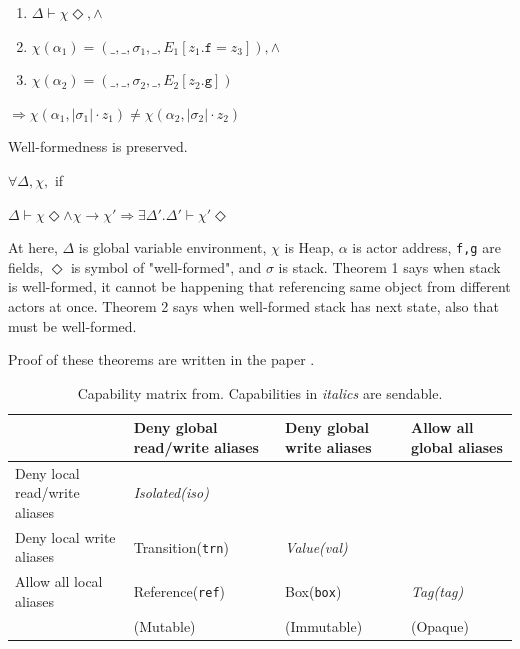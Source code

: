 \documentclass{article}
\begin{document}
\begin{multicols}{2}
\begin{theorem}
	\begin{enumerate}
		\item $\Delta \vdash \chi \Diamond, \land$ 
		\item $\chi(\alpha_1) = (\_,\_,\sigma_1, \_,  E_1[z_1.\texttt{f} = z_3]), \land$ 
		\item $\chi(\alpha_2) = (\_,\_,\sigma_2, \_,  E_2[z_2.\texttt{g}])$
	\end{enumerate} 
	
	 $\Rightarrow \chi(\alpha_1, |\sigma_1|\cdot z_1) \neq \chi(\alpha_2, |\sigma_2| \cdot z_2)$
\end{theorem}

\begin{theorem} 
	Well-formedness is preserved.
	
	$\forall \Delta, \chi,$ if
	
	 $\Delta \vdash \chi \Diamond \land \chi \rightarrow \chi' \Rightarrow  \exists \Delta'.\Delta' \vdash \chi'\Diamond$
\end{theorem}

At here, $\Delta$ is global variable environment, $\chi$ is Heap, $\alpha$ is actor address, \texttt{f,g} are fields, $\Diamond$ is symbol of "well-formed", and $\sigma$ is stack. 
Theorem 1 says when stack is well-formed, it cannot be happening that referencing same object from different actors at once. Theorem 2 says when well-formed stack has next state, also that must be well-formed.

Proof of these theorems are written in the paper \cite{type-proof-paper}.


\begin{table}[]
\begin{tabularx}{\textwidth}{|X|X|X|X|}
 \hline
 & Deny global read/write aliases & Deny global write aliases & Allow all global aliases \\  \hline
Deny local read/write aliases & \textit{Isolated(iso) }    &                           &                        \\  \hline
Deny local write aliases      & Transition(\texttt{trn})                & \textit{Value(val)  }              &                        \\  \hline
Allow all local aliases       & Reference(\texttt{ref})                 & Box(\texttt{box})                  & \textit{Tag(tag)  }             \\  \hline
                              & (Mutable)                      & (Immutable)               & (Opaque)   \\ \hline           
\end{tabularx}
\caption{Capability matrix from\cite{type-proof-paper}. Capabilities in \textit{italics} are sendable.}
\end{table}


\end{multicols}
\end{document}
